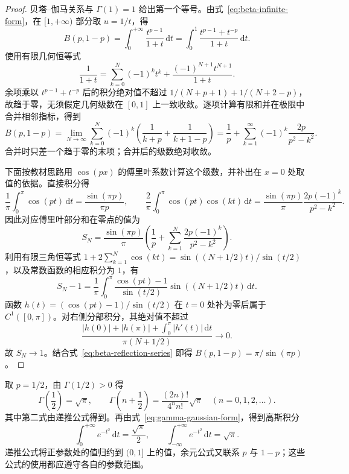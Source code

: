 \begin{proof}
贝塔--伽马关系与 $\Gamma(1)=1$ 给出第一个等号。由式~\eqref{eq:beta-infinite-form}，在 $[1,+\infty)$ 部分取 $u=1/t$，得
\[
    B(p,1-p)=\int_0^{+\infty}\frac{t^{p-1}}{1+t}\,\mathrm{d}t
    =\int_0^1\frac{t^{p-1}+t^{-p}}{1+t}\,\mathrm{d}t.
\]
使用有限几何恒等式
\[
    \frac1{1+t}=\sum_{k=0}^N(-1)^kt^k
       +\frac{(-1)^{N+1}t^{N+1}}{1+t}.
\]
余项乘以 $t^{p-1}+t^{-p}$ 后的积分绝对值不超过
$1/(N+p+1)+1/(N+2-p)$，故趋于零，无须假定几何级数在 $[0,1]$ 上一致收敛。逐项计算有限和并在极限中合并相邻指标，得到
\begin{equation}
    B(p,1-p)
    =\lim_{N\to\infty}\sum_{k=0}^N(-1)^k
       \left(\frac1{k+p}+\frac1{k+1-p}\right)
    =\frac1p+\sum_{k=1}^{\infty}(-1)^k\frac{2p}{p^2-k^2}.
    \label{eq:beta-reflection-series}
\end{equation}
合并时只差一个趋于零的末项；合并后的级数绝对收敛。

下面按教材思路用 $\cos(px)$ 的傅里叶系数计算这个级数，并补出在 $x=0$ 处取值的依据。直接积分得
\[
    \frac1\pi\int_0^\pi\cos(pt)\,\mathrm{d}t
       =\frac{\sin(\pi p)}{\pi p},\qquad
    \frac2\pi\int_0^\pi\cos(pt)\cos(kt)\,\mathrm{d}t
       =\frac{\sin(\pi p)}\pi\frac{2p(-1)^k}{p^2-k^2}.
\]
因此对应傅里叶部分和在零点的值为
\[
    S_N=\frac{\sin(\pi p)}\pi
       \left(\frac1p+\sum_{k=1}^N\frac{2p(-1)^k}{p^2-k^2}\right).
\]
利用有限三角恒等式 $1+2\sum_{k=1}^N\cos(kt)=\sin((N+1/2)t)/\sin(t/2)$，以及常数函数的相应积分为 $1$，有
\[
    S_N-1=\frac1\pi\int_0^\pi
      \frac{\cos(pt)-1}{\sin(t/2)}\sin((N+1/2)t)\,\mathrm{d}t.
\]
函数 $h(t)=(\cos(pt)-1)/\sin(t/2)$ 在 $t=0$ 处补为零后属于 $C^1([0,\pi])$。对右侧分部积分，其绝对值不超过
\[
    \frac{|h(0)|+|h(\pi)|+\int_0^\pi|h'(t)|\,\mathrm{d}t}
         {\pi(N+1/2)}\longrightarrow0.
\]
故 $S_N\to1$。结合式~\eqref{eq:beta-reflection-series} 即得 $B(p,1-p)=\pi/\sin(\pi p)$。
\end{proof}

取 $p=1/2$，由 $\Gamma(1/2)>0$ 得
\begin{equation}
    \Gamma\left(\frac12\right)=\sqrt\pi,\qquad
    \Gamma\left(n+\frac12\right)
       =\frac{(2n)!}{4^n n!}\sqrt\pi\quad(n=0,1,2,\ldots).
    \label{eq:gamma-half-integer-values}
\end{equation}
其中第二式由递推公式得到。再由式~\eqref{eq:gamma-gaussian-form}，得到高斯积分
\begin{equation}
    \int_0^{+\infty}e^{-t^2}\,\mathrm{d}t=\frac{\sqrt\pi}{2},
    \qquad\int_{-\infty}^{+\infty}e^{-t^2}\,\mathrm{d}t=\sqrt\pi.
    \label{eq:gamma-gaussian-integral}
\end{equation}
递推公式将正参数处的值归约到 $(0,1]$ 上的值，余元公式又联系 $p$ 与 $1-p$；这些公式的使用都应遵守各自的参数范围。

